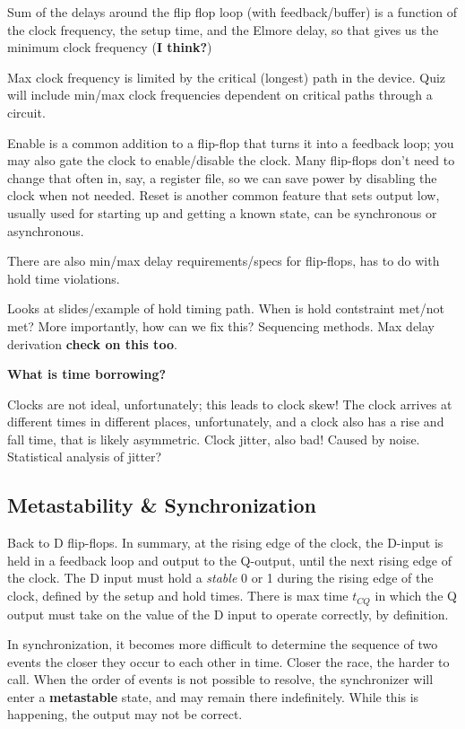\documentclass{article}
\begin{document}
Sum of the delays around the flip flop loop (with feedback/buffer) is a function of the clock frequency, the setup time, and the Elmore delay, so that gives us the minimum clock frequency (\textbf{I think?})

Max clock frequency is limited by the critical (longest) path in the device. Quiz will include min/max clock frequencies dependent on critical paths through a circuit. 

Enable is a common addition to a flip-flop that turns it into a feedback loop; you may also gate the clock to enable/disable the clock. Many flip-flops don't need to change that often in, say, a register file, so we can save power by disabling the clock when not needed. Reset is another common feature that sets output low, usually used for starting up and getting a known state, can be synchronous or asynchronous.

There are also min/max delay requirements/specs for flip-flops, has to do with hold time violations.

Looks at slides/example of hold timing path. When is hold contstraint met/not met? More importantly, how can we fix this? Sequencing methods. Max delay derivation \textbf{check on this too}.

\textbf{What is time borrowing?}

Clocks are not ideal, unfortunately; this leads to clock skew! The clock arrives at different times in different places, unfortunately, and a clock also has a rise and fall time, that is likely asymmetric. Clock jitter, also bad! Caused by noise. Statistical analysis of jitter?

\subsection{Metastability \& Synchronization}
Back to D flip-flops. In summary, at the rising edge of the clock, the D-input is held in a feedback loop and output to the Q-output, until the next rising edge of the clock. The D input must hold a \textit{stable} 0 or 1 during the rising edge of the clock, defined by the setup and hold times. There is max time \(t_{CQ}\) in which the Q output must take on the value of the D input to operate correctly, by definition.

In synchronization, it becomes more difficult to determine the sequence of two events the closer they occur to each other in time. Closer the race, the harder to call. When the order of events is not possible to resolve, the synchronizer will enter a \textbf{metastable} state, and may remain there indefinitely. While this is happening, the output may not be correct.
\end{document}
